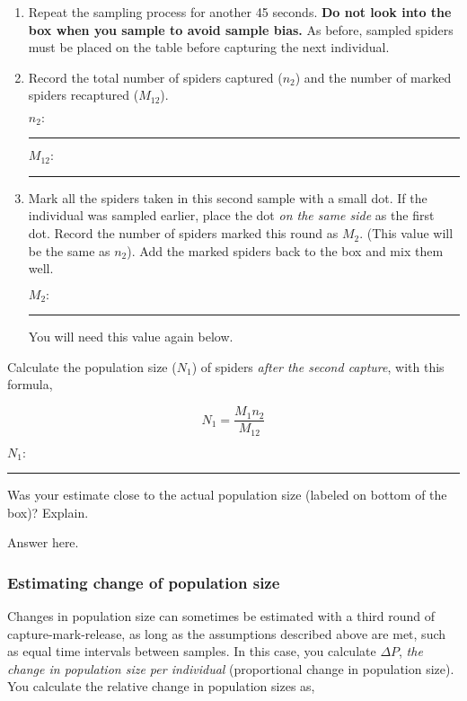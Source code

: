 \documentclass[12pt, hidelinks]{exam}
\newcommand*\AnswerBox[2]{%
    \parbox[t][#1]{0.92\textwidth}{%
    \begin{solution}#2\end{solution}}
    \vspace{\stretch{1}}
}
\begin{document}
\begin{questions}
\begin{enumerate}

	\item Repeat the sampling process for another 45 seconds.  \textbf{Do not look into the box when you sample to avoid sample bias.} As before, sampled spiders must be placed on the table before capturing the next individual. %
	
	\item Record the total number of spiders captured ($n_2$) and the
	number of marked spiders recaptured ($M_{12}$). 
	
	\bigskip
	
	$n_2\colon$ \rule{0.75in}{0.4pt} \bigskip
	
	$M_{12}\colon$ \rule{0.75in}{0.4pt}
	
	\item Mark all the spiders taken in this second sample with a small dot. If the individual was sampled earlier, place the dot \emph{on the same side} as the first dot. Record the 	number of spiders marked this round as $M_2$. (This value will
	be the same as $n_2$). Add the marked spiders back to the box and mix them well.
	
	\bigskip
	
	$M_2\colon$ \rule{0.75in}{0.4pt}
	
	You will need this value again below.
	
\end{enumerate}

\question
Calculate the population size ($N_1$) of
spiders \emph{after the second capture}, with this formula,

\[ N_1 = \dfrac{M_1 n_2}{M_{12}}\]

\medskip

$N_1\colon$ \rule{0.75in}{0.4pt}

\question
Was your estimate close to the actual population size (labeled on
bottom of the box)? Explain.

\AnswerBox{2\baselineskip}{Answer here.}

\subsubsection*{Estimating change of population size}

Changes in population size can sometimes be estimated with a third round of capture-mark-release, as long as the assumptions described above are met, such as equal time intervals between samples. In this case, you calculate
$\Delta P$, \emph{the change in population size per individual} (proportional change in
population size). You calculate the relative change in
population sizes as,


\end{questions}
\end{document}
